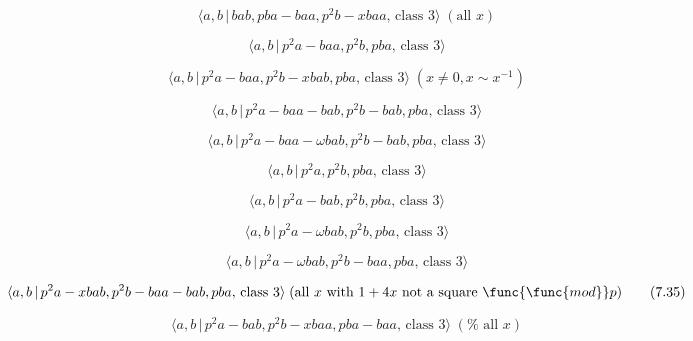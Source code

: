 \documentclass[10pt]{article}
\begin{document}
\begin{equation}
\langle a,b\,|\,bab,pba-baa,p^2b-xbaa,\,\text{class }3\rangle \;(\text{all }%
x)  \tag{7.26}
\end{equation}

\begin{equation}
\langle a,b\,|\,p^2a-baa,p^2b,pba,\,\text{class }3\rangle  \tag{7.27}
\end{equation}

\begin{equation}
\langle a,b\,|\,p^2a-baa,p^2b-xbab,pba,\,\text{class }3\rangle \;(x \neq 0,
x \sim x^{-1})  \tag{7.28}
\end{equation}

\begin{equation}
\langle a,b\,|\,p^2a-baa-bab,p^2b-bab,pba,\,\text{class }3\rangle  \tag{7.29}
\end{equation}

\begin{equation}
\langle a,b\,|\,p^{2}a-baa-\omega bab,p^{2}b-bab,pba,\,\text{class }3\rangle
\tag{7.30}
\end{equation}

\begin{equation}
\langle a,b\,|\,p^2a,p^2b,pba,\,\text{class }3\rangle  \tag{7.31}
\end{equation}

\begin{equation}
\langle a,b\,|\,p^2a-bab,p^2b,pba,\,\text{class }3\rangle  \tag{7.32}
\end{equation}

\begin{equation}
\langle a,b\,|\,p^{2}a-\omega bab,p^{2}b,pba,\,\text{class }3\rangle 
\tag{7.33}
\end{equation}

\begin{equation}
\langle a,b\,|\,p^{2}a-\omega bab,p^{2}b-baa,pba,\,\text{class }3\rangle 
\tag{7.34}
\end{equation}

\begin{equation}
\langle a,b\,|\,p^2a-xbab,p^2b-baa-bab,pba,\,\text{class }3\rangle \;(\text{%
all }x\text{ with }1+4x\text{ not a square }\func{\func{mod}}p)  \tag{7.35}
\end{equation}

\begin{equation}
\langle a,b\,|\,p^2a-bab,p^2b-xbaa,pba-baa,\,\text{class }3\rangle \;(\text{%
all }x)  \tag{7.36}
\end{equation}
\end{document}
